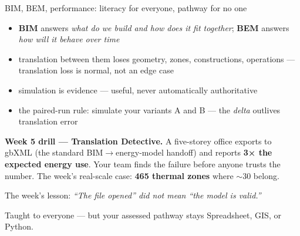 \documentclass[aspectratio=169,10pt]{beamer}
\newcommand{\muted}[1]{{\color{cMute}#1}}
\begin{document}
\begin{frame}{BIM, BEM, performance: literacy for everyone, pathway for no one}
  \begin{itemize}
    \item \textbf{BIM} answers \emph{what do we build and how does it fit together};
          \textbf{BEM} answers \emph{how will it behave over time}
    \item translation between them loses geometry, zones, constructions,
          operations --- \alert{translation loss is normal, not an edge case}
    \item simulation is evidence --- useful, never automatically authoritative
    \item the paired-run rule: simulate your variants A and B --- the
          \emph{delta} outlives translation error
  \end{itemize}
  \vspace{.5mm}
  \begin{tcolorbox}[enhanced,sharp corners,frame hidden,colback=cInk!5,
    borderline west={2.5pt}{0pt}{cAccent},boxsep=3pt,left=6pt]
    \footnotesize\textbf{Week 5 drill --- Translation Detective.} A five-storey
    office exports to gbXML (the standard BIM\(\rightarrow\)energy-model
    handoff) and reports \textbf{3× the expected energy use}. Your team finds
    the failure before anyone trusts the number. The week's real-scale case:
    \textbf{465 thermal zones} where \(\sim\)30 belong.
  \end{tcolorbox}
  \vspace{1mm}
  The week's lesson: \emph{``The file opened'' did not mean ``the model is
  valid.''}\par
  \muted{Taught to everyone --- but your assessed pathway stays Spreadsheet,
  GIS, or Python.}
\end{frame}
\end{document}
